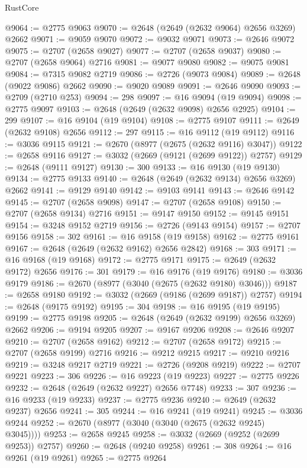\begin{lexlean}{RustCore}
\begin{coremodule}
@9064 := @2775 @9063
@9070 := @2648 (@2649 (@2632 @9064) @2656 @3269) @2662
@9071 := @9059 @9070
@9072 := @9032 @9071
@9073 := @2646 @9072
@9075 := @2707 (@2658 @9027)
@9077 := @2707 (@2658 @9037)
@9080 := @2707 (@2658 @9064) @2716
@9081 := @9077 @9080
@9082 := @9075 @9081
@9084 := @7315 @9082 @2719
@9086 := @2726 (@9073 @9084)
@9089 := @2648 (@9022 @9086) @2662
@9090 := @9020 @9089
@9091 := @2646 @9090
@9093 := @2709 (@2710 @253)
@9094 := 298
@9097 := @16 @9094 (@19 @9094)
@9098 := @2775 @9097
@9103 := @2648 (@2649 (@2632 @9098) @2656 @2925)
@9104 := 299
@9107 := @16 @9104 (@19 @9104)
@9108 := @2775 @9107
@9111 := @2649 (@2632 @9108) @2656
@9112 := 297
@9115 := @16 @9112 (@19 @9112)
@9116 := @3036 @9115
@9121 := @2670 (@8977 (@2675 (@2632 @9116) @3047))
@9122 := @2658 @9116
@9127 := @3032 (@2669 (@9121 (@2699 @9122)) @2757)
@9129 := @2648 (@9111 @9127)
@9130 := 300
@9133 := @16 @9130 (@19 @9130)
@9134 := @2775 @9133
@9140 := @2648 (@2649 (@2632 @9134) @2656 @3269) @2662
@9141 := @9129 @9140
@9142 := @9103 @9141
@9143 := @2646 @9142
@9145 := @2707 (@2658 @9098)
@9147 := @2707 (@2658 @9108)
@9150 := @2707 (@2658 @9134) @2716
@9151 := @9147 @9150
@9152 := @9145 @9151
@9154 := @3248 @9152 @2719
@9156 := @2726 (@9143 @9154)
@9157 := @2707 @9156
@9158 := 302
@9161 := @16 @9158 (@19 @9158)
@9162 := @2775 @9161
@9167 := @2648 (@2649 (@2632 @9162) @2656 @2842)
@9168 := 303
@9171 := @16 @9168 (@19 @9168)
@9172 := @2775 @9171
@9175 := @2649 (@2632 @9172) @2656
@9176 := 301
@9179 := @16 @9176 (@19 @9176)
@9180 := @3036 @9179
@9186 := @2670 (@8977 (@3040 (@2675 (@2632 @9180) @3046)))
@9187 := @2658 @9180
@9192 := @3032 (@2669 (@9186 (@2699 @9187)) @2757)
@9194 := @2648 (@9175 @9192)
@9195 := 304
@9198 := @16 @9195 (@19 @9195)
@9199 := @2775 @9198
@9205 := @2648 (@2649 (@2632 @9199) @2656 @3269) @2662
@9206 := @9194 @9205
@9207 := @9167 @9206
@9208 := @2646 @9207
@9210 := @2707 (@2658 @9162)
@9212 := @2707 (@2658 @9172)
@9215 := @2707 (@2658 @9199) @2716
@9216 := @9212 @9215
@9217 := @9210 @9216
@9219 := @3248 @9217 @2719
@9221 := @2726 (@9208 @9219)
@9222 := @2707 @9221
@9223 := 306
@9226 := @16 @9223 (@19 @9223)
@9227 := @2775 @9226
@9232 := @2648 (@2649 (@2632 @9227) @2656 @7748)
@9233 := 307
@9236 := @16 @9233 (@19 @9233)
@9237 := @2775 @9236
@9240 := @2649 (@2632 @9237) @2656
@9241 := 305
@9244 := @16 @9241 (@19 @9241)
@9245 := @3036 @9244
@9252 := @2670 (@8977 (@3040 (@3040 (@2675 (@2632 @9245) @3045))))
@9253 := @2658 @9245
@9258 := @3032 (@2669 (@9252 (@2699 @9253)) @2757)
@9260 := @2648 (@9240 @9258)
@9261 := 308
@9264 := @16 @9261 (@19 @9261)
@9265 := @2775 @9264

\end{coremodule}
\end{lexlean}
